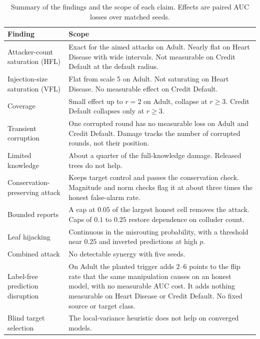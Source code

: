 \documentclass[11pt]{article}
\newcommand{\rev}[1]{#1}
\newcommand{\revfloat}[1]{#1}
\begin{document}
\begin{table}[htbp]
\centering
\revfloat{\caption{Summary of the findings and the scope of each claim. Effects are paired AUC losses over matched seeds.}\label{tab:summary}}
\begin{tabular}{p{4.0cm}p{9.8cm}}
\toprule
\rev{Finding} & \rev{Scope} \\
\midrule
\rev{Attacker-count saturation (HFL)} & \rev{Exact for the aimed attacks on Adult. Nearly flat on Heart Disease with wide intervals. Not measurable on Credit Default at the default radius.} \\
\rev{Injection-size saturation (VFL)} & \rev{Flat from scale 5 on Adult. Not saturating on Heart Disease. No measurable effect on Credit Default.} \\
\rev{Coverage} & \rev{Small effect up to $r=2$ on Adult, collapse at $r\geq3$. Credit Default collapses only at $r\geq3$.} \\
\rev{Transient corruption} & \rev{One corrupted round has no measurable loss on Adult and Credit Default. Damage tracks the number of corrupted rounds, not their position.} \\
\rev{Limited knowledge} & \rev{About a quarter of the full-knowledge damage. Released trees do not help.} \\
\rev{Conservation-preserving attack} & \rev{Keeps target control and passes the conservation check. Magnitude and norm checks flag it at about three times the honest false-alarm rate.} \\
\rev{Bounded reports} & \rev{A cap at $0.05$ of the largest honest cell removes the attack. Caps of $0.1$ to $0.25$ restore dependence on colluder count.} \\
\rev{Leaf hijacking} & \rev{Continuous in the misrouting probability, with a threshold near $0.25$ and inverted predictions at high $p$.} \\
\rev{Combined attack} & \rev{No detectable synergy with five seeds.} \\
\rev{Label-free prediction disruption} & \rev{On Adult the planted trigger adds $2$--$6$ points to the flip rate that the same manipulation causes on an honest model, with no measurable AUC cost. It adds nothing measurable on Heart Disease or Credit Default. No fixed source or target class.} \\
\rev{Blind target selection} & \rev{The local-variance heuristic does not help on converged models.} \\
\bottomrule
\end{tabular}
\end{table}
\end{document}
